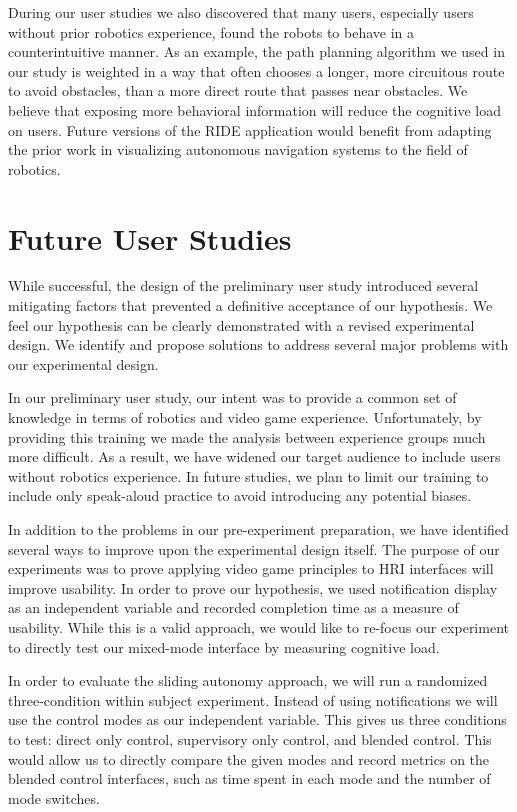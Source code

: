 During our user studies we also discovered that many users, especially users without prior robotics experience, found the robots to behave in a counterintuitive manner. As an example, the path planning algorithm we used in our study is weighted in a way that often chooses a longer, more circuitous route to avoid obstacles, than a more direct route that passes near obstacles. We believe that exposing more behavioral information will reduce the cognitive load on users. Future versions of the RIDE application would benefit from adapting the prior work in visualizing autonomous navigation systems to the field of robotics.

\section{Future User Studies}
\label{sec:futurestudy}
While successful, the design of the preliminary user study introduced several mitigating factors that prevented a definitive acceptance of our hypothesis. We feel our hypothesis can be clearly demonstrated with a revised experimental design. We identify and propose solutions to address several major problems with our experimental design.

In our preliminary user study, our intent was to provide a common set of knowledge in terms of robotics and video game experience. Unfortunately, by providing this training we made the analysis between experience groups much more difficult. As a result, we have widened our target audience to include users without robotics experience. In future studies, we plan to limit our training to include only speak-aloud practice to avoid introducing any potential biases.

In addition to the problems in our pre-experiment preparation, we have identified several ways to improve upon the experimental design itself. The purpose of our experiments was to prove applying video game principles to HRI interfaces will improve usability. In order to prove our hypothesis, we used notification display as an independent variable and recorded completion time as a measure of usability. While this is a valid approach, we would like to re-focus our experiment to directly test our mixed-mode interface by measuring cognitive load. 

In order to evaluate the sliding autonomy approach, we will run a randomized three-condition within subject experiment. Instead of using notifications we will use the control modes as our independent variable. This gives us three conditions to test: direct only control, supervisory only control, and blended control. This would allow us to directly compare the given modes and record metrics on the blended control interfaces, such as time spent in each mode and the number of mode switches.

